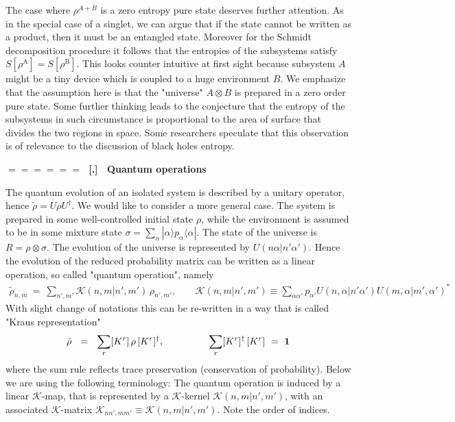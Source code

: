 \documentclass[onecolumn,fleqn]{revtex4}
\newcommand{\tbox}[1]{\text{#1}}
\newcommand{\beq}{\begin{eqnarray}}
\newcommand{\eeq}{\end{eqnarray}}
\renewcommand{\thesubsection}{\arabic{subsection}}
\renewcommand{\thesubsubsection}{\arabic{subsubsection}}
\newcommand{\sheadC}[1]
{
\addtocounter{subsubsection}{1}
\vspace{5mm}
{\Large\bf $=\!=\!=\!=\!=\!=\;$ [\thesubsection.\thesubsubsection] \ #1}  
\nopagebreak
\phantomsection
}
\begin{document}
The case where $\rho^{A+B}$ is 
a zero entropy pure state 
deserves further attention.
As in the special case of a singlet, 
we can argue that if the state 
cannot be written as a product, then 
it must be an entangled state. 
Moreover for the Schmidt decomposition 
procedure it follows 
that the entropies of the subsystems  
satisfy $S[\rho^{\tbox{A}}]=S[\rho^{\tbox{B}}]$. 
This looks counter intuitive at first 
sight because subsystem $A$ might be 
a tiny device which is coupled  
to a huge environment $B$. We emphasize  
that the assumption here is that the 
"universe" $A \otimes B$ is prepared 
in a zero order pure state. 
Some further thinking leads to the conjecture 
that the entropy of the subsystems in 
such circumstance is proportional to the 
area of surface that divides the two regions 
in space. Some researchers speculate that 
this observation is of relevance to the discussion 
of black holes entropy.   



\sheadC{Quantum operations}

The quantum evolution of an isolated system is described 
by a unitary operator, hence ${\tilde{\rho} = U \rho U^{\dag}}$.
We would like to consider a more general case.
The system is prepared in some well-controlled initial state  $\rho$, 
while the environment is assumed to be in some mixture 
state ${\sigma = \sum_{\alpha} |\alpha\rangle p_{\alpha} \langle\alpha|}$.
The state of the universe is ${R = \rho \otimes \sigma}$. 
The evolution of the universe is represented by $U(n\alpha|n'\alpha')$.     
Hence the evolution of the reduced probability matrix 
can be written as a linear operation, so called "quantum operation", namely 
\beq 
\tilde{\rho}_{n,m} \ = \ 
\sum_{n',m'} \mathcal{K}(n,m|n',m') \, \rho_{n',m'}, 
\ \ \ \ \ \ \ \ \ 
\mathcal{K}(n,m|n',m') \equiv \sum_{\alpha\alpha'}p_{\alpha'}U(n,\alpha|n'\alpha') U(m,\alpha|m',\alpha')^*
\eeq
With slight change of notations this can be re-written 
in a way that is called "Kraus representation" 
\beq
\tilde{\rho} \ \ = \ \  \sum_r [K^r] \, \rho \, [K^r]^{\dagger},
\ \ \ \ \ \ \ \ \ \ \ \ \ \ 
\sum_r [K^r]^{\dagger} \, [K^r] \ = \ \bf{1}
\eeq
where the sum rule reflects trace preservation (conservation of probability). 
Below we are using the following terminology: 
The quantum operation is induced by a linear $\mathcal{K}$-map, 
that is represented by a $\mathcal{K}$-kernel ${\mathcal{K}(n,m|n',m')}$,
with an associated $\mathcal{K}$-matrix ${\mathcal{K}_{nn',mm'} \equiv \mathcal{K}(n,m|n',m')}$. 
Note the order of indices. 
\end{document}
